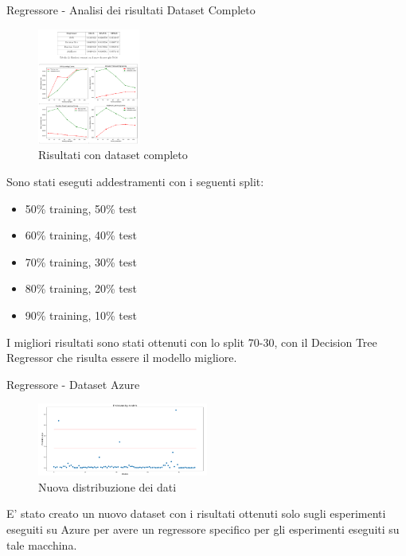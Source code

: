 \begin{frame}{Regressore - Analisi dei risultati Dataset Completo}
    \begin{figure}
    \centering
    \includegraphics[width=0.3\textwidth]{images/RisultatiRegCompleto.png}
    \caption{Risultati con dataset completo}
\end{figure}
\small
Sono stati eseguti addestramenti con i seguenti split:
\begin{itemize}
    \item 50\% training, 50\% test
    \item 60\% training, 40\% test
    \item 70\% training, 30\% test
    \item 80\% training, 20\% test
    \item 90\% training, 10\% test
\end{itemize} 
I migliori risultati sono stati ottenuti con lo split 70-30, con il Decision Tree Regressor che risulta essere il modello migliore.
\end{frame}



\begin{frame}{Regressore - Dataset Azure}
    \begin{figure}
    \centering
    \includegraphics[width=0.5\textwidth]{images/distribuzioneAzure.png}
    \caption{Nuova distribuzione dei dati}
\end{figure}

E' stato creato un nuovo dataset con i risultati ottenuti solo sugli esperimenti eseguiti su Azure per avere un regressore specifico per gli esperimenti eseguiti su tale macchina.

\end{frame}


